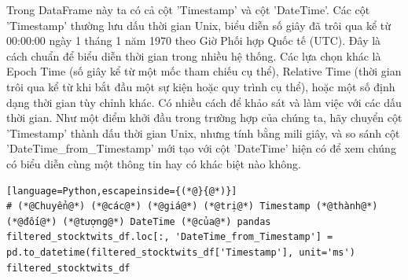 Trong DataFrame này ta có cả cột 'Timestamp' và cột 'DateTime'. Các cột 'Timestamp' thường lưu dấu thời gian Unix, biểu diễn số giây đã trôi qua kể từ 00:00:00 ngày 1 tháng 1 năm 1970 theo Giờ Phối hợp Quốc tế (UTC). Đây là cách chuẩn để biểu diễn thời gian trong nhiều hệ thống. Các lựa chọn khác là Epoch Time (số giây kể từ một mốc tham chiếu cụ thể), Relative Time (thời gian trôi qua kể từ khi bắt đầu một sự kiện hoặc quy trình cụ thể), hoặc một số định dạng thời gian tùy chỉnh khác. Có nhiều cách để khảo sát và làm việc với các dấu thời gian. Như một điểm khởi đầu trong trường hợp của chúng ta, hãy chuyển cột 'Timestamp' thành dấu thời gian Unix, nhưng tính bằng mili giây, và so sánh cột 'DateTime\_from\_Timestamp' mới tạo với cột 'DateTime' hiện có để xem chúng có biểu diễn cùng một thông tin hay có khác biệt nào không.

\begin{lstlisting}[language=Python,escapeinside={(*@}{@*)}]
# (*@Chuyển@*) (*@các@*) (*@giá@*) (*@trị@*) Timestamp (*@thành@*) (*@đối@*) (*@tượng@*) DateTime (*@của@*) pandas
filtered_stocktwits_df.loc[:, 'DateTime_from_Timestamp'] = pd.to_datetime(filtered_stocktwits_df['Timestamp'], unit='ms')
filtered_stocktwits_df
\end{lstlisting}

